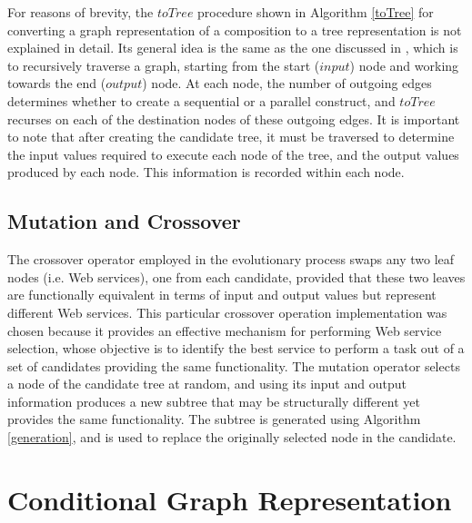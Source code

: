 For reasons of brevity, the $toTree$ procedure shown in Algorithm \ref{toTree} for converting a graph representation of a composition to a tree representation is not explained in detail. Its general idea is the same as the one discussed in \cite{nguyen2005text}, which is to recursively traverse a graph, starting from the start ($input$) node and working towards the end ($output$) node. At each node, the number of outgoing edges determines whether to create a sequential or a parallel construct, and $toTree$ recurses on each of the destination nodes of these outgoing edges. It is important to note that after creating the candidate tree, it must be traversed to determine the input values required to execute each node of the tree, and the output values produced by each node. This information is recorded within each node.

\subsection{Mutation and Crossover}\label{mutation}

The crossover operator employed in the evolutionary process swaps any two leaf nodes (i.e. Web services), one from each candidate, provided that these two leaves are functionally equivalent in terms of input and output values but represent different Web services. This particular crossover operation implementation was chosen because it provides an effective mechanism for performing Web service selection, whose objective is to identify the best service to perform a task out of a set of candidates providing the same functionality.
The mutation operator selects a node of the candidate tree at random, and using its input and output information produces a new subtree that may be structurally different yet provides the same functionality. The subtree is generated using Algorithm \ref{generation}, and is used to  replace the originally selected node in the candidate.

\section{Conditional Graph Representation}

